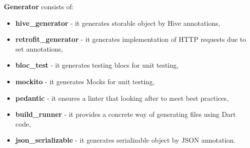 \textbf{Generator} consists of:
\begin{itemize}
    \item \textbf{hive\_generator} - it generates storable object by Hive annotations,
    \item \textbf{retrofit\_generator} - it generates implementation of HTTP requests due to set annotations,
    \item \textbf{bloc\_test} - it generates testing blocs for unit testing,
    \item \textbf{mockito} - it generates Mocks for unit testing,
    \item \textbf{pedantic} - it ensures a linter that looking after to meet best practices,
    \item \textbf{build\_runner} - it provides a concrete way of generating files using Dart code,
    \item \textbf{json\_serializable} - it generates serializable object by JSON annotation.
\end{itemize}
